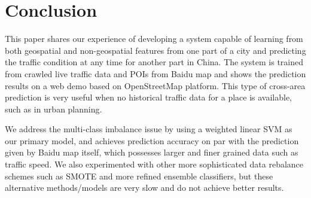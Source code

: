 \section{Conclusion}

This paper shares our experience of developing a system capable 
of learning from both geospatial and non-geospatial features from 
one part of a city and predicting the traffic condition at 
any time for another part in China. The system is trained from crawled
live traffic data and POIs from Baidu map and shows the 
prediction results on a web demo based on OpenStreetMap platform.
This type of cross-area prediction is very useful when no historical
traffic data for a place is available, such as in urban planning.
 
We address the multi-class imbalance issue by using a weighted linear SVM
as our primary model, and achieves prediction accuracy on par with
the prediction given by Baidu map itself, which possesses larger and
finer grained data such as traffic speed. We also experimented with
other more sophisticated data rebalance schemes such as SMOTE and
more refined ensemble classifiers, but
these alternative methods/models are very slow and do not 
achieve better results.  

